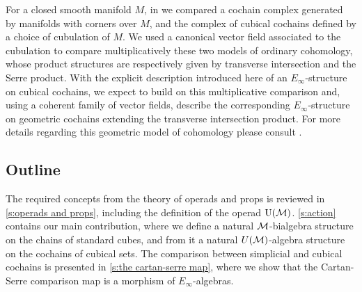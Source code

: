 For a closed smooth manifold $M$, in \cite{medina2021flowing} we compared a cochain complex generated by manifolds with corners over $M$, and the complex of cubical cochains defined by a choice of cubulation of $M$.
We used a canonical vector field associated to the cubulation to compare multiplicatively these two models of ordinary cohomology, whose product structures are respectively given by transverse intersection and the Serre product.
With the explicit description introduced here of an $E_\infty$-structure on cubical cochains, we expect to build on this multiplicative comparison and, using a coherent family of vector fields, describe the corresponding $E_\infty$-structure on geometric cochains extending the transverse intersection product.
For more details regarding this geometric model of cohomology please consult \cite{medina2021foundations}.

\subsection*{Outline}

The required concepts from the theory of operads and props is reviewed in \cref{s:operads and props}, including the definition of the operad ${\operatorname{U}(\mathcal{M})}$.
\cref{s:action} contains our main contribution, where we define a natural $\mathcal{M}$-bialgebra structure on the chains of standard cubes, and from it a natural $U(\mathcal{M})$-algebra structure on the cochains of cubical sets.
The comparison between simplicial and cubical cochains is presented in \cref{s:the cartan-serre map}, where we show that the Cartan-Serre comparison map is a morphism of $E_\infty$-algebras.